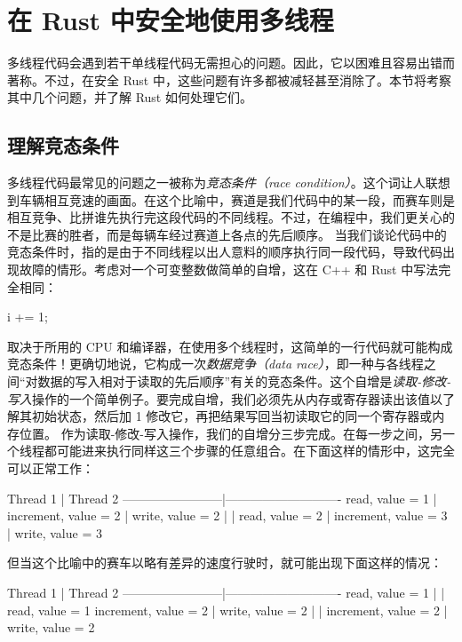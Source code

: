 \section{在 Rust 中安全地使用多线程}
\label{idx:idx_b499a9c6}
多线程代码会遇到若干单线程代码无需担心的问题。因此，它以困难且容易出错而著称。不过，在安全 Rust 中，这些问题有许多都被减轻甚至消除了。本节将考察其中几个问题，并了解 Rust 如何处理它们。
\subsection{理解竞态条件}
\label{idx:idx_1beae75a}
\label{idx:idx_67b3ff99}
多线程代码最常见的问题之一被称为\emph{竞态条件（race condition）}。这个词让人联想到车辆相互竞速的画面。在这个比喻中，赛道是我们代码中的某一段，而赛车则是相互竞争、比拼谁先执行完这段代码的不同线程。不过，在编程中，我们更关心的不是比赛的胜者，而是每辆车经过赛道上各点的先后顺序。
当我们谈论代码中的竞态条件时，指的是由于不同线程以出人意料的顺序执行同一段代码，导致代码出现故障的情形。考虑对一个可变整数做简单的自增，这在 C++ 和 Rust 中写法完全相同：
\begin{codebox}[text]
i += 1;
\end{codebox}
取决于所用的 CPU 和编译器，在使用多个线程时，这简单的一行代码就可能构成竞态条件！更确切地说，它构成一次\emph{数据竞争（data race）}，即一种与各线程之间“对数据的写入相对于读取的先后顺序”有关的竞态条件。这个自增是\emph{读取-修改-写入}操作的一个简单例子。要完成自增，我们必须先从内存或寄存器读出该值以了解其初始状态，然后加 1 修改它，再把结果写回当初读取它的同一个寄存器或内存位置。
作为读取-\allowbreak{}修改-\allowbreak{}写入操作，我们的自增分三步完成。在每一步之间，另一个线程都可能进来执行同样这三个步骤的任意组合。在下面这样的情形中，这完全可以正常工作：
\begin{codeboxdark}
Thread 1                |    Thread 2
------------------------|----------------------------
read, value = 1         |
increment, value = 2    |
write, value = 2        |
                        |    read, value = 2
                        |    increment, value = 3
                        |    write, value = 3
\end{codeboxdark}
\label{idx:idx_e0aefdc3}
\label{idx:idx_7835ba9d}
但当这个比喻中的赛车以略有差异的速度行驶时，就可能出现下面这样的情况：
\begin{codeboxdark}
Thread 1                |    Thread 2
------------------------|----------------------------
read, value = 1         |
                        |    read, value = 1
increment, value = 2    |
write, value = 2        |
                        |    increment, value = 2
                        |    write, value = 2
\end{codeboxdark}
